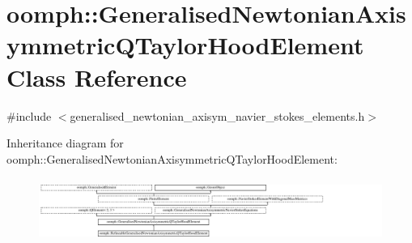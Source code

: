 \hypertarget{classoomph_1_1GeneralisedNewtonianAxisymmetricQTaylorHoodElement}{}\section{oomph\+:\+:Generalised\+Newtonian\+Axisymmetric\+Q\+Taylor\+Hood\+Element Class Reference}
\label{classoomph_1_1GeneralisedNewtonianAxisymmetricQTaylorHoodElement}


{\ttfamily \#include $<$generalised\+\_\+newtonian\+\_\+axisym\+\_\+navier\+\_\+stokes\+\_\+elements.\+h$>$}

Inheritance diagram for oomph\+:\+:Generalised\+Newtonian\+Axisymmetric\+Q\+Taylor\+Hood\+Element\+:\begin{figure}[H]
\begin{center}
\leavevmode
\includegraphics[height=2.102102cm]{classoomph_1_1GeneralisedNewtonianAxisymmetricQTaylorHoodElement}
\end{center}
\end{figure}
